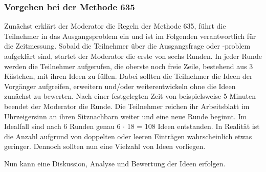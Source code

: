 \subsubsection*{Vorgehen bei der Methode 635}
Zunächst erklärt der Moderator die Regeln der Methode 635, führt die Teilnehmer in das Ausgangsproblem ein und ist im Folgenden verantwortlich für die Zeitmessung. Sobald die Teilnehmer über die Ausgangsfrage oder -problem aufgeklärt sind, startet der Moderator die erste von sechs Runden. In jeder Runde werden die Teilnehmer aufgerufen, die oberste noch freie Zeile, bestehend aus 3 Kästchen, mit ihren Ideen zu füllen. Dabei sollten die Teilnehmer die Ideen der Vorgänger aufgreifen, erweitern und/oder weiterentwickeln ohne die Ideen zunächst zu bewerten. Nach einer festgelegten Zeit von beispielsweise 5 Minuten beendet der Moderator die Runde. Die Teilnehmer reichen ihr Arbeitsblatt im Uhrzeigersinn an ihren Sitznachbarn weiter und eine neue Runde beginnt. Im Idealfall sind nach 6 Runden genau 6 $\cdot$ 18 = 108 Ideen entstanden. In Realität ist die Anzahl aufgrund von doppelten oder leeren Einträgen wahrscheinlich etwas geringer. Dennoch sollten nun eine Vielzahl von Ideen vorliegen.


Nun kann eine Diskussion, Analyse und Bewertung der Ideen erfolgen.

\newpage


\newpage


\newpage


\newpage


\newpage


\newpage


\newpage


\newpage


\newpage

